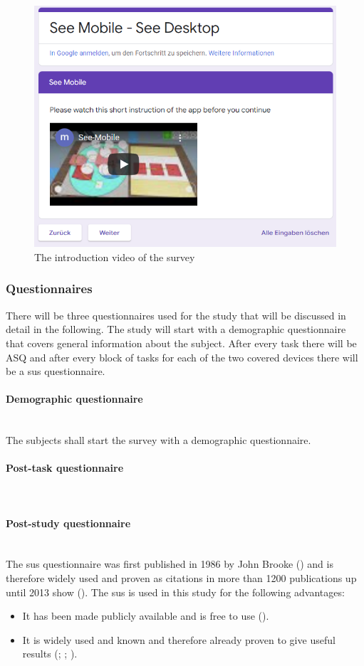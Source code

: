 \begin{figure}[H]
  \centering
  \includegraphics[width=1\textwidth]{Evaluation/img/form_video.png}
  \caption{The introduction video of the survey}\label{fig:video}
\end{figure}

\subsubsection{Questionnaires}
\label{questionaires}
There will be three questionnaires used for the study that will be discussed in detail in the following.
The study will start with a demographic questionnaire that covers general information about the subject.
After every task there will be \gls{ASQ} and after every block of tasks for each of the two covered devices there will be a \gls{sus} questionnaire.
\paragraph{Demographic questionnaire}\mbox{}\\
The subjects shall start the survey with a demographic questionnaire.
\paragraph{Post-task questionnaire}\mbox{}\\
\paragraph{Post-study questionnaire}\mbox{}\\
The \gls{sus} questionnaire was first published in 1986 by John Brooke (\cite{brooke1996sus}) and is therefore widely used and proven as citations in more than 1200 publications up until 2013 show (\cite{brooke2013}).
The \gls{sus} is used in this study for the following advantages: 
\begin{itemize}
  \item It has been made publicly available and is free to use (\cite{brooke1996sus}).
  \item It is widely used and known and therefore already proven to give useful results (\cite{brooke2013}; \cite{lewis2018system}; \cite{grier2013system}).
\end{itemize}
